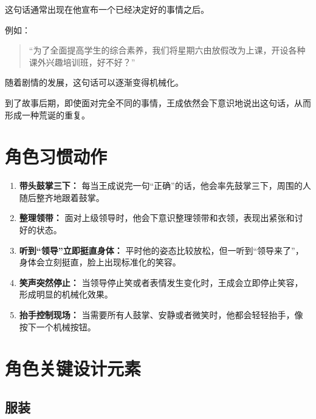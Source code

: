 \documentclass[12pt,a4paper]{ctexart}
\begin{document}
这句话通常出现在他宣布一个已经决定好的事情之后。

例如：

\begin{quote}
    “为了全面提高学生的综合素养，我们将星期六由放假改为上课，开设各种课外兴趣培训班，好不好？”
\end{quote}

随着剧情的发展，这句话可以逐渐变得机械化。

到了故事后期，即使面对完全不同的事情，王成依然会下意识地说出这句话，从而形成一种荒诞的重复。

\section{角色习惯动作}

\begin{enumerate}[leftmargin=2.5em]
    \item \textbf{带头鼓掌三下：}
          每当王成说完一句“正确”的话，他会率先鼓掌三下，周围的人随后整齐地跟着鼓掌。

    \item \textbf{整理领带：}
          面对上级领导时，他会下意识整理领带和衣领，表现出紧张和讨好的状态。

    \item \textbf{听到“领导”立即挺直身体：}
          平时他的姿态比较放松，但一听到“领导来了”，身体会立刻挺直，脸上出现标准化的笑容。

    \item \textbf{笑声突然停止：}
          当领导停止笑或者表情发生变化时，王成会立即停止笑容，形成明显的机械化效果。

    \item \textbf{抬手控制现场：}
          当需要所有人鼓掌、安静或者微笑时，他都会轻轻抬手，像按下一个机械按钮。
\end{enumerate}

\section{角色关键设计元素}

\subsection{服装}
\end{document}
